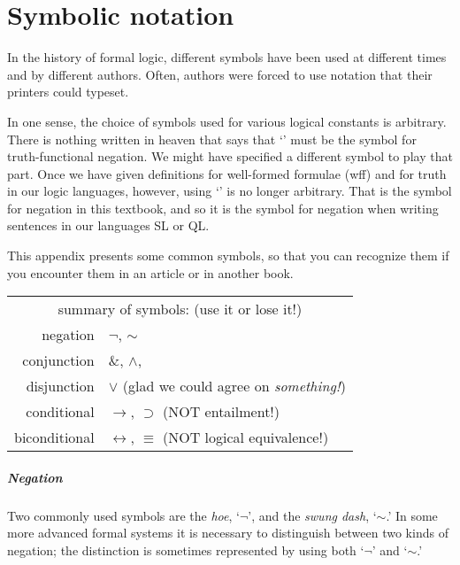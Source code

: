 ﻿%
\chapter[Other symbolic notation]{Symbolic notation}
\label{app.notation}

In the history of formal logic, different symbols have been used at different times and by different authors. Often, authors were forced to use notation that their printers could typeset.

In one sense, the choice of symbols used for various logical constants is arbitrary. There is nothing written in heaven that says that `\enot' must be the symbol for truth-functional negation. We might have specified a different symbol to play that part. Once we have given definitions for well-formed formulae (wff) and for truth in our logic languages, however, using `\enot' is no longer arbitrary. That is the symbol for negation in this textbook, and so it is the symbol for negation when writing sentences in our languages SL or QL.

This appendix presents some common symbols, so that you can recognize them if you encounter them in an article or in another book.

\begin{center}
\begin{tabular}{rl}
\multicolumn{2}{c}{summary of symbols: (use it or lose it!)}\\
negation & $\neg$, ${\sim}$\\
conjunction & $\&$, $\wedge$,	{\scriptsize\textbullet}\\
disjunction & $\vee$ (glad we could agree on \textit{something!})\\
conditional & $\rightarrow$, $\supset$ (NOT entailment!)\\
biconditional & $\leftrightarrow$, $\equiv$ (NOT logical equivalence!)
\end{tabular}
\end{center}

\paragraph{Negation} Two commonly used symbols are the \emph{hoe}, `$\neg$', and the \emph{swung dash}, `${\sim}$.' In some more advanced formal systems it is necessary to distinguish between two kinds of negation; the distinction is sometimes represented by using both `$\neg$' and `${\sim}$.'


